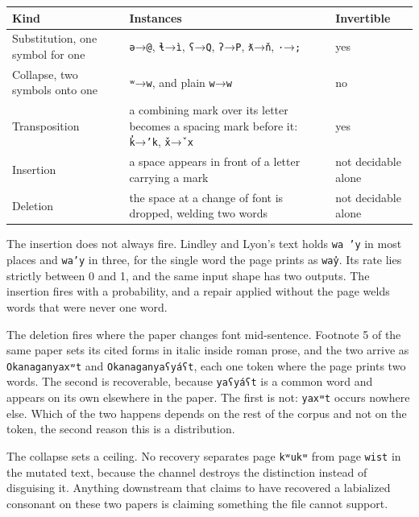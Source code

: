 \tiny
\setlength{\tabcolsep}{2pt}
\begin{longtable}{@{}>{\raggedright\arraybackslash}p{}>{\raggedright\arraybackslash}p{}>{\raggedright\arraybackslash}p{}@{}}
\toprule
Kind & Instances & Invertible \\
\midrule
Substitution, one symbol for one & \texttt{ə}→\texttt{@}, \texttt{ɬ}→\texttt{ì}, \texttt{ʕ}→\texttt{Q}, \texttt{ʔ}→\texttt{P}, \texttt{ƛ}→\texttt{ň}, \texttt{·}→\texttt{;} & yes \\
Collapse, two symbols onto one & \texttt{ʷ}→\texttt{w}, and plain \texttt{w}→\texttt{w} & no \\
Transposition & a combining mark over its letter becomes a spacing mark before it: \texttt{k̓}→\texttt{’k}, \texttt{x̌}→\texttt{ˇx} & yes \\
Insertion & a space appears in front of a letter carrying a mark & not decidable alone \\
Deletion & the space at a change of font is dropped, welding two words & not decidable alone \\
\bottomrule
\end{longtable}
\normalsize

The insertion does not always fire. Lindley and Lyon's text holds \texttt{wa ’y} in most places and \texttt{wa’y} in three, for the single word the page prints as \texttt{way̓}. Its rate lies strictly between 0 and 1, and the same input shape has two outputs. The insertion fires with a probability, and a repair applied without the page welds words that were never one word.

The deletion fires where the paper changes font mid-sentence. Footnote 5 of the same paper sets its cited forms in italic inside roman prose, and the two arrive as \texttt{Okanaganyaxʷt} and \texttt{Okanaganyaʕyáʕt}, each one token where the page prints two words. The second is recoverable, because \texttt{yaʕyáʕt} is a common word and appears on its own elsewhere in the paper. The first is not: \texttt{yaxʷt} occurs nowhere else. Which of the two happens depends on the rest of the corpus and not on the token, the second reason this is a distribution.

The collapse sets a ceiling. No recovery separates page \texttt{kʷukʷ} from page \texttt{wist} in the mutated text, because the channel destroys the distinction instead of disguising it. Anything downstream that claims to have recovered a labialized consonant on these two papers is claiming something the file cannot support.


